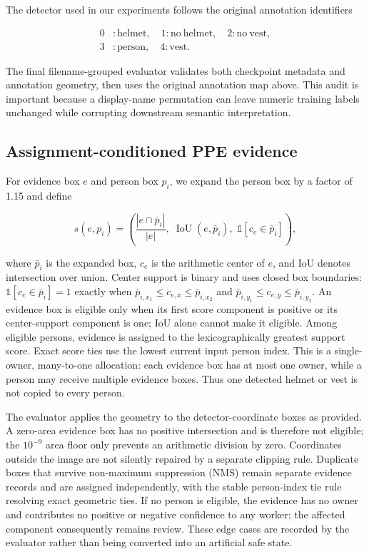 \documentclass[iicol,pdflatex,sn-mathphys-num]{sn-jnl}
\begin{document}
The detector used in our experiments follows the original annotation identifiers

\begin{equation}
\begin{aligned}
0&:\mathrm{helmet},\quad 1:\mathrm{no\ helmet},\quad 2:\mathrm{no\ vest},\\
3&:\mathrm{person},\quad 4:\mathrm{vest}.
\end{aligned}
\end{equation}

The final filename-grouped evaluator validates both checkpoint metadata and annotation geometry, then uses the original annotation map above. This audit is important because a display-name permutation can leave numeric training labels unchanged while corrupting downstream semantic interpretation.

\subsection{Assignment-conditioned PPE evidence}

For evidence box $e$ and person box $p_i$, we expand the person box by a factor of 1.15 and define

\begin{equation}
s(e,p_i)=\left(\frac{|e\cap \bar p_i|}{|e|},\;\operatorname{IoU}(e,\bar p_i),\;\mathbb{1}[c_e\in \bar p_i]\right),
\end{equation}

where $\bar p_i$ is the expanded box, $c_e$ is the arithmetic center of $e$, and IoU denotes intersection over union. Center support is binary and uses closed box boundaries: $\mathbb{1}[c_e\in\bar p_i]=1$ exactly when $\bar p_{i,x_1}\leq c_{e,x}\leq\bar p_{i,x_2}$ and $\bar p_{i,y_1}\leq c_{e,y}\leq\bar p_{i,y_2}$. An evidence box is eligible only when its first score component is positive or its center-support component is one; IoU alone cannot make it eligible. Among eligible persons, evidence is assigned to the lexicographically greatest support score. Exact score ties use the lowest current input person index. This is a single-owner, many-to-one allocation: each evidence box has at most one owner, while a person may receive multiple evidence boxes. Thus one detected helmet or vest is not copied to every person.

The evaluator applies the geometry to the detector-coordinate boxes as provided. A zero-area evidence box has no positive intersection and is therefore not eligible; the $10^{-9}$ area floor only prevents an arithmetic division by zero. Coordinates outside the image are not silently repaired by a separate clipping rule. Duplicate boxes that survive non-maximum suppression (NMS) remain separate evidence records and are assigned independently, with the stable person-index tie rule resolving exact geometric ties. If no person is eligible, the evidence has no owner and contributes no positive or negative confidence to any worker; the affected component consequently remains review. These edge cases are recorded by the evaluator rather than being converted into an artificial safe state.
\end{document}
